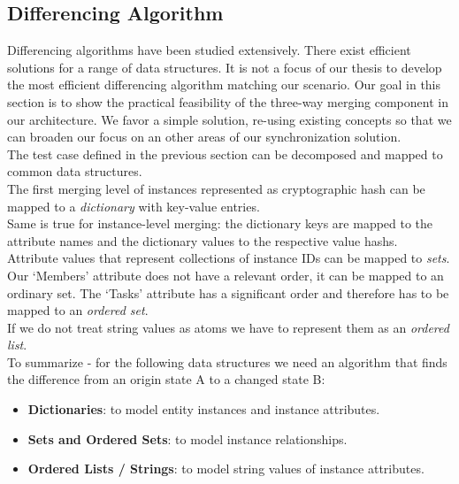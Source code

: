 \subsection{Differencing Algorithm}
\label{sec:main.histo.merging.diff-algo}
Differencing algorithms have been studied extensively.
There exist efficient solutions for a range of data structures.
It is not a focus of our thesis to develop the most efficient differencing algorithm matching our scenario.
Our goal in this section is to show the practical feasibility of the three-way merging component in our architecture.
We favor a simple solution, re-using existing concepts so that we can broaden our focus on an other areas of our synchronization solution.\\
The test case defined in the previous section can be decomposed and mapped to common data structures.\\
The first merging level of instances represented as cryptographic hash can be mapped to a \emph{dictionary} with key-value entries.\\
Same is true for instance-level merging: the dictionary keys are mapped to the attribute names and the dictionary values to the respective value hashs.\\
Attribute values that represent collections of instance IDs can be mapped to \emph{sets}.
Our `Members' attribute does not have a relevant order, it can be mapped to an ordinary set.
The `Tasks' attribute has a significant order and therefore has to be mapped to an \emph{ordered set}.\\
If we do not treat string values as atoms we have to represent them as an \emph{ordered list}.\\

To summarize - for the following data structures we need an algorithm that finds the difference from an origin state A to a changed state B:

\begin{itemize}
\item \textbf{Dictionaries}: to model entity instances and instance attributes.
\item \textbf{Sets and Ordered Sets}: to model instance relationships.
\item \textbf{Ordered Lists / Strings}: to model string values of instance attributes.
\end{itemize}


